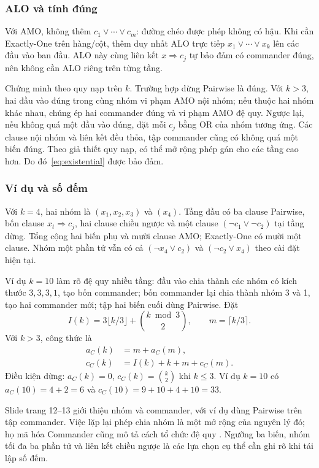 \subsubsection{ALO và tính đúng}
Với AMO, không thêm $c_1\lor\cdots\lor c_m$: đường chéo được phép không có hậu. Khi cần Exactly-One trên hàng/cột, thêm duy nhất ALO trực tiếp $x_1\lor\cdots\lor x_k$ lên các đầu vào ban đầu. ALO này cùng liên kết $x\Rightarrow c_j$ tự bảo đảm có commander đúng, nên không cần ALO riêng trên từng tầng.

Chứng minh theo quy nạp trên $k$. Trường hợp dừng Pairwise là đúng. Với $k>3$, hai đầu vào đúng trong cùng nhóm vi phạm AMO nội nhóm; nếu thuộc hai nhóm khác nhau, chúng ép hai commander đúng và vi phạm AMO đệ quy. Ngược lại, nếu không quá một đầu vào đúng, đặt mỗi $c_j$ bằng OR của nhóm tương ứng. Các clause nội nhóm và liên kết đều thỏa, tập commander cũng có không quá một biến đúng. Theo giả thiết quy nạp, có thể mở rộng phép gán cho các tầng cao hơn. Do đó~\eqref{eq:existential} được bảo đảm.

\subsubsection{Ví dụ và số đếm}
Với $k=4$, hai nhóm là $(x_1,x_2,x_3)$ và $(x_4)$. Tầng đầu có ba clause Pairwise, bốn clause $x_t\Rightarrow c_j$, hai clause chiều ngược và một clause $(\neg c_1\lor\neg c_2)$ tại tầng dừng. Tổng cộng hai biến phụ và mười clause AMO; Exactly-One có mười một clause. Nhóm một phần tử vẫn có cả $(\neg x_4\lor c_2)$ và $(\neg c_2\lor x_4)$ theo cài đặt hiện tại.

Ví dụ $k=10$ làm rõ đệ quy nhiều tầng: đầu vào chia thành các nhóm có kích thước $3,3,3,1$, tạo bốn commander; bốn commander lại chia thành nhóm 3 và 1, tạo hai commander mới; tập hai biến cuối dùng Pairwise. Đặt
\[
I(k)=3\lfloor k/3\rfloor+\binom{k\bmod3}{2},\qquad m=\lceil k/3\rceil.
\]
Với $k>3$, công thức là
\begin{align}
a_C(k)&=m+a_C(m),\\
c_C(k)&=I(k)+k+m+c_C(m).
\label{eq:commander-count}
\end{align}
Điều kiện dừng: $a_C(k)=0$, $c_C(k)=\binom k2$ khi $k\le3$. Ví dụ $k=10$ có $a_C(10)=4+2=6$ và $c_C(10)=9+10+4+10=33$.

Slide trang 12--13 \citep{amoSlides} giới thiệu nhóm và commander, với ví dụ dùng Pairwise trên tập commander. Việc lặp lại phép chia nhóm là một mở rộng của nguyên lý đó; họ mã hóa Commander cũng mô tả cách tổ chức đệ quy \citep{klieber2007}. Ngưỡng ba biến, nhóm tối đa ba phần tử và liên kết chiều ngược là các lựa chọn cụ thể cần ghi rõ khi tái lập số đếm.

